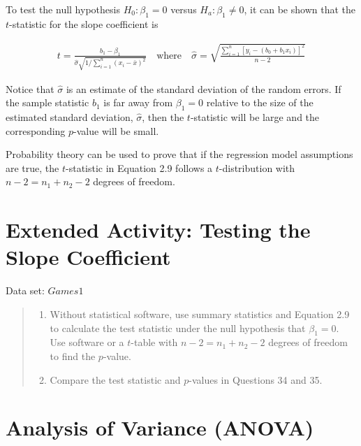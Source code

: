 \documentclass[
]{report}
\providecommand{\tightlist}{%
  \setlength{\itemsep}{0pt}\setlength{\parskip}{0pt}}
\begin{document}
To test the null hypothesis \(H_0\!:\! \beta_1 = 0\) versus \(H_a\!:\! \beta_1 \ne 0\), it can be shown that the \(t\)-statistic for the slope coefficient is

\begin{align} \label{2.9}
t = \frac{b_1 - \beta_1}{\hat{\sigma} \sqrt{1 / \sum_{i=1}^{n}(x_i - \bar{x})^2}} \quad \text{where} \quad \hat{\sigma} = \sqrt{\frac{\sum_{i=1}^{n}[y_i - (b_0 + b_1 x_i)]^2}{n-2}}
\tag{2.9}
\end{align}

Notice that \(\hat{\sigma}\) is an estimate of the standard deviation of the random errors. If the sample statistic \(b_1\) is far away from \(\beta_1 = 0\) relative to the size of the estimated standard deviation, \(\hat{\sigma}\), then the \(t\)-statistic will be large and the corresponding \(p\)-value will be small.

Probability theory can be used to prove that if the regression model assumptions are true, the \(t\)-statistic in Equation 2.9 follows a \(t\)-distribution with \(n - 2 = n_1 + n_2 - 2\) degrees of freedom.

\hypertarget{extended-activity-testing-the-slope-coefficient}{%
\section*{Extended Activity: Testing the Slope Coefficient}\label{extended-activity-testing-the-slope-coefficient}}

Data set: \(Games1\)

\begin{quote}
\begin{enumerate}
\def\labelenumi{\arabic{enumi}.}
\setcounter{enumi}{34}
\tightlist
\item
  Without statistical software, use summary statistics and Equation 2.9 to calculate the test statistic under the null hypothesis that \(\beta_1 = 0\). Use software or a \(t\)-table with \(n - 2 = n_1 + n_2 - 2\) degrees of freedom to find the \(p\)-value.
\item
  Compare the test statistic and \(p\)-values in Questions 34 and 35.
\end{enumerate}
\end{quote}

\hypertarget{analysis-of-variance-anova}{%
\section*{Analysis of Variance (ANOVA)}\label{analysis-of-variance-anova}}
\end{document}
